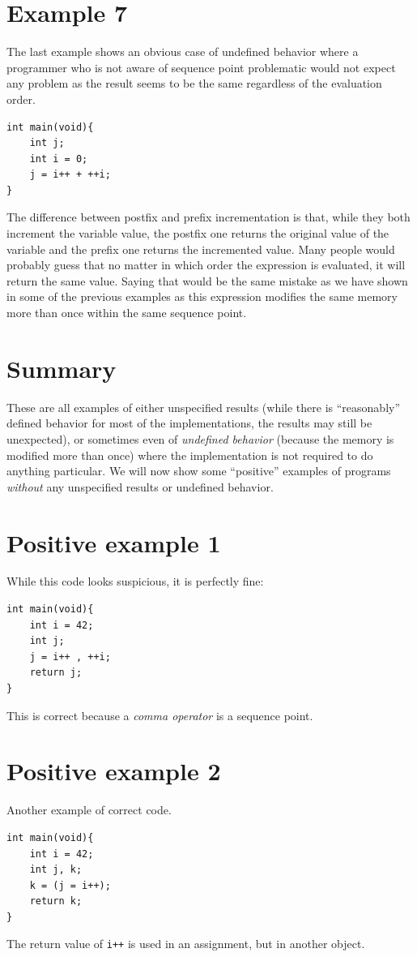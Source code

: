 \section{Example 7}\label{example7}
The last example shows an obvious case of undefined behavior where a programmer who is not aware of sequence point problematic would not expect any problem as the result seems to be the same regardless of the evaluation order.
\begin{lstlisting}
int main(void){
    int j;
    int i = 0;
    j = i++ + ++i;
}
\end{lstlisting}
The difference between postfix and prefix incrementation is that, while they both increment the variable value, the postfix one returns the original value of the variable and the prefix one returns the incremented value. Many people would probably guess that no matter in which order the expression is evaluated, it will return the same value. Saying that would be the same mistake as we have shown in some of the previous examples as this expression modifies the same memory more than once within the same sequence point.

\section{Summary}
These are all examples of either unspecified results (while there is ``reasonably'' defined behavior for most of the implementations, the results may still be unexpected), or sometimes even of \emph{undefined behavior} (because the memory is modified more than once) where the implementation is not required to do anything particular. We will now show some ``positive'' examples of programs \emph{without} any unspecified results or undefined behavior.

\section{Positive example 1}
While this code looks suspicious, it is perfectly fine:
\begin{lstlisting}
int main(void){
    int i = 42;
    int j;
    j = i++ , ++i;
    return j;
}
\end{lstlisting}
This is correct because a \emph{comma operator} is a sequence point.

\section{Positive example 2}
Another example of correct code.
\begin{lstlisting}
int main(void){
    int i = 42;
    int j, k;
    k = (j = i++);
    return k;
}
\end{lstlisting}
The return value of \verb|i++| is used in an assignment, but in another object.

